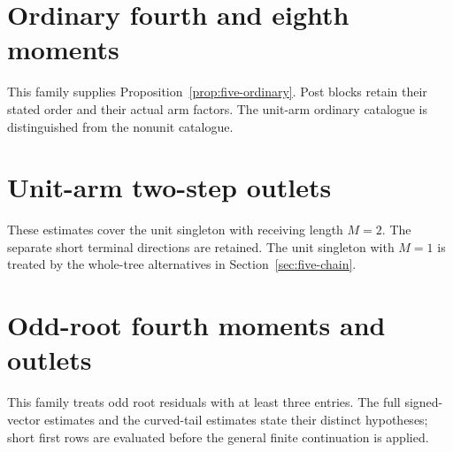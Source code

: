\section{Ordinary fourth and eighth moments}\label{app:five-ordinary-moments}
This family supplies Proposition~\ref{prop:five-ordinary}. Post blocks retain their stated order and their actual arm factors. The unit-arm ordinary catalogue is distinguished from the nonunit catalogue.









































\section{Unit-arm two-step outlets}\label{app:five-unit-outlets}
These estimates cover the unit singleton with receiving length $M=2$. The separate short terminal directions are retained. The unit singleton with $M=1$ is treated by the whole-tree alternatives in Section~\ref{sec:five-chain}.











\section{Odd-root fourth moments and outlets}\label{app:five-odd-outlets}
This family treats odd root residuals with at least three entries. The full signed-vector estimates and the curved-tail estimates state their distinct hypotheses; short first rows are evaluated before the general finite continuation is applied.

